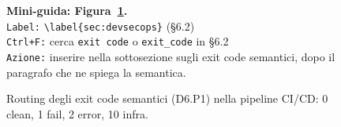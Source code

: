 \begin{figure}[ht]
{\begin{tikzpicture}
    \end{tikzpicture}
  }%
  \caption{Routing degli exit code semantici (D6.P1) nella pipeline \gls{CI/CD}: 0 clean, 1 fail, 2 error, 10 infra.}
  \label{fig:cicd-decision-tree}
  \par\smallskip
  {\small \noindent\textbf{Mini-guida: Figura~\ref{fig:cicd-decision-tree}.}\\
    \texttt{Label:} \verb|\label{sec:devsecops}| (\S6.2)\\
    \texttt{Ctrl+F:} cerca \texttt{exit code} o \texttt{exit\_code} in \S6.2\\
    \texttt{Azione:} inserire nella sottosezione sugli exit code semantici, dopo il paragrafo che ne spiega la semantica. }
\end{figure}

